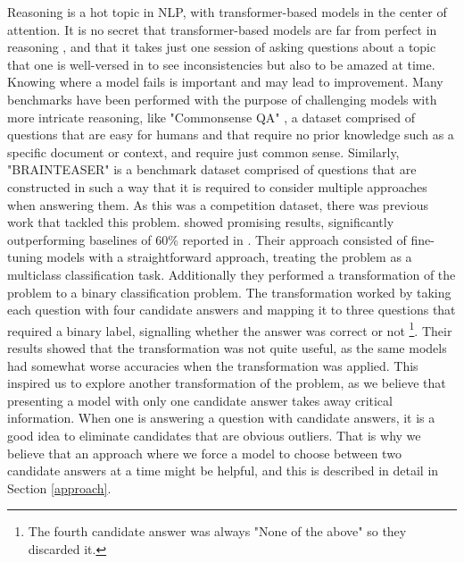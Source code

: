 Reasoning is a hot topic in NLP, with transformer-based models in the center of attention.
It is no secret that transformer-based models are far from perfect in reasoning \citep{yuan2023}, and that it takes just one session of asking questions about a topic that one is well-versed in to see inconsistencies but also to be amazed at time.
Knowing where a model fails is important and may lead to improvement.  Many benchmarks have been performed with the purpose of challenging models with more intricate reasoning, like "Commonsense QA" \citep{commonsenseQA}, a dataset comprised of questions that are easy for humans and that require no prior knowledge such as a specific document or context, and require just common sense.
Similarly, "BRAINTEASER" \citep{semeval} is a benchmark dataset comprised of questions that are constructed in such a way that it is required to consider multiple approaches when answering them.
As this was a competition dataset, there was previous work that tackled this problem.
\citet{ails-lab} showed promising results, significantly outperforming baselines of 60\% reported in \citep{semeval}.
Their approach consisted of fine-tuning models with a straightforward approach, treating the problem as a multiclass classification task. Additionally they performed a transformation of the problem to a binary classification problem. 
The transformation worked by taking each question with four candidate answers and mapping it to three questions that required a binary label, signalling whether the answer was correct or not \footnote[1]{The fourth candidate answer was always "None of the above" so they discarded it.}.
Their results showed that the transformation was not quite useful, as the same models had somewhat worse accuracies when the transformation was applied.  
This inspired us to explore another transformation of the problem, as we believe that presenting a model with only one candidate answer takes away critical information.
When one is answering a question with candidate answers, it is a good idea to eliminate candidates that are obvious outliers.
That is why we believe that an approach where we force a model to choose between two candidate answers at a time might be helpful, and this is described in detail in Section \ref{approach}.